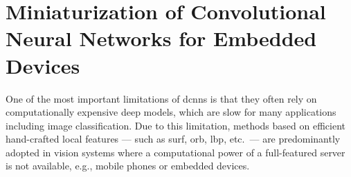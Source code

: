 
\graphicspath{{img/parking/}}

\chapter{Miniaturization of Convolutional Neural Networks for Embedded Devices}
\label{ch:miniaturization}

One of the most important limitations of \glspl{dcnn} is that they often rely on computationally expensive deep models, which are slow for many applications including image classification.
Due to this limitation, methods based on efficient hand-crafted local features --- such as \acrshort{surf}, \acrshort{orb}, \acrshort{lbp}, etc.\ --- are predominantly adopted in vision systems where a computational power of a full-featured server is not available, e.g., mobile phones or embedded devices.

